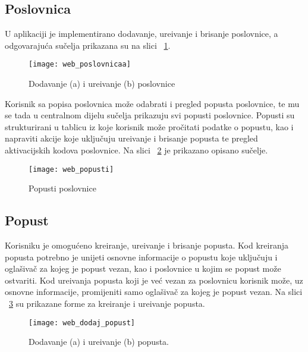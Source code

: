 \subsection{Poslovnica}

U aplikaciji je implementirano dodavanje, ure\dj ivanje i brisanje poslovnice, a odgovaraju\'{c}a su\v{c}elja prikazana su na slici ~\ref{fig:web_poslovnicaa}.

\begin{figure}[!htbp]
	\begin{center}
 \texttt{[image: web\_poslovnicaa]}
 \caption{Dodavanje (a) i ure\dj ivanje (b) poslovnice}
 \label{fig:web_poslovnicaa}
	\end{center}
\end{figure}

Korisnik sa popisa poslovnica mo\v{z}e odabrati i pregled popusta poslovnice, te mu se tada u centralnom dijelu su\v{c}elja prikazuju svi popusti poslovnice. Popusti su strukturirani u tablicu iz koje korisnik mo\v{z}e pro\v{c}itati podatke o popustu, kao i napraviti akcije koje uklju\v{c}uju ure\dj ivanje i brisanje popusta te pregled aktivacijskih kodova poslovnice. Na slici ~\ref{fig:web_popusti} je prikazano opisano su\v{c}elje.

\begin{figure}[!htbp]
	\begin{center}
 \texttt{[image: web\_popusti]}
 \caption{Popusti poslovnice}
 \label{fig:web_popusti}
	\end{center}
\end{figure}



\subsection{Popust}

Korisniku je omogu\'{c}eno kreiranje, ure\dj ivanje i brisanje popusta. Kod kreiranja popusta potrebno je unijeti osnovne informacije o popustu koje uklju\v{c}uju i ogla\v{s}iva\v{c} za kojeg je popust vezan, kao i poslovnice u kojim se popust mo\v{z}e ostvariti. Kod ure\dj ivanja popusta koji je ve\'{c} vezan za poslovnicu korisnik mo\v{z}e, uz osnovne informacije, promijeniti samo ogla\v{s}iva\v{c} za kojeg je popust vezan. Na slici ~\ref{fig:web_dodaj_popust} su prikazane forme za kreiranje i ure\dj ivanje popusta.

\begin{figure}[!htbp]
	\begin{center}
 \texttt{[image: web\_dodaj\_popust]}
 \caption{Dodavanje (a) i ure\dj ivanje (b) popusta.}
 \label{fig:web_dodaj_popust}
	\end{center}
\end{figure}



